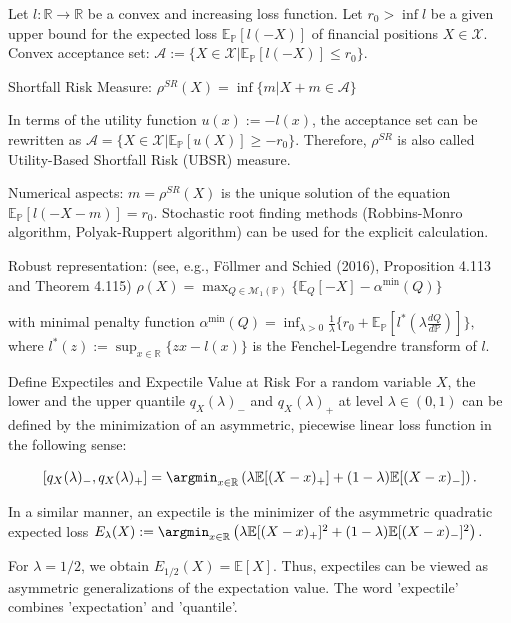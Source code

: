 {Let \( l : \mathbb{R} \to \mathbb{R} \) be a convex and increasing loss function.
Let \( r_0 > \inf l \) be a given upper bound for the expected loss \(\mathbb{E}_{\mathbb{P}}[l(-X)]\) of financial positions \( X \in \mathcal{X} \).
Convex acceptance set: \(\mathcal{A} := \{X \in \mathcal{X} | \mathbb{E}_{\mathbb{P}}[l(-X)] \leq r_0 \}\).

Shortfall Risk Measure: 
\(\rho^{SR}(X) = \inf \{m | X + m \in \mathcal{A}\}\)

In terms of the utility function \( u(x) := -l(x) \), the acceptance set can be rewritten as
\(\mathcal{A} = \{X \in \mathcal{X} | \mathbb{E}_{\mathbb{P}}[u(X)] \geq -r_0 \}\).
Therefore, \(\rho^{SR}\) is also called Utility-Based Shortfall Risk (UBSR) measure.

Numerical aspects:
\( m = \rho^{SR}(X) \) is the unique solution of the equation \(\mathbb{E}_{\mathbb{P}}[l(-X - m)] = r_0\).
Stochastic root finding methods (Robbins-Monro algorithm, Polyak-Ruppert algorithm) can be used for the explicit calculation.

Robust representation: (see, e.g., Föllmer and Schied (2016), Proposition 4.113 and Theorem 4.115)
\(
\rho(X) = \max_{Q \in \mathcal{M}_1(\mathbb{P})} \{\mathbb{E}_{Q}[-X] - \alpha^{\min}(Q)\}
\)

with minimal penalty function
\(
\alpha^{\min}(Q) = \inf_{\lambda > 0} \frac{1}{\lambda} \{r_0 + \mathbb{E}_{\mathbb{P}}[l^*(\lambda \frac{dQ}{d\mathbb{P}})]\},
\)
where \( l^*(z) := \sup_{x \in \mathbb{R}} \{zx - l(x)\} \) is the Fenchel-Legendre transform of \( l \).


Define Expectiles and Expectile Value at Risk
For a random variable \(X\), the lower and the upper quantile \(q_{X}(\lambda)_{-}\) and \(q_X(\lambda)_{+}\) 
at level \(\lambda \in (0,1)\) can be defined by the minimization of an asymmetric, piecewise linear loss function in the following sense:

\[
[q_{X}(\lambda)_{-}, q_X(\lambda)_{+}] = \argmin_{x \in \mathbb{R}} \left(\lambda \mathbb{E}[(X-x)_{+}] + (1-\lambda) \mathbb{E}[(X-x)_{-}]\right).
\]

In a similar manner, an expectile is the minimizer of the asymmetric quadratic expected loss
\(
E_\lambda(X) := \argmin_{x \in \mathbb{R}} \left(\lambda \mathbb{E}[(X-x)_{+}]^2 + (1-\lambda) \mathbb{E}[(X-x)_{-}]^2\right).
\)

For \(\lambda=1/2\), we obtain \(E_{1/2}(X) = \mathbb{E}[X]\).
Thus, expectiles can be viewed as asymmetric generalizations of the expectation value.
The word 'expectile' combines 'expectation' and 'quantile'.


}
